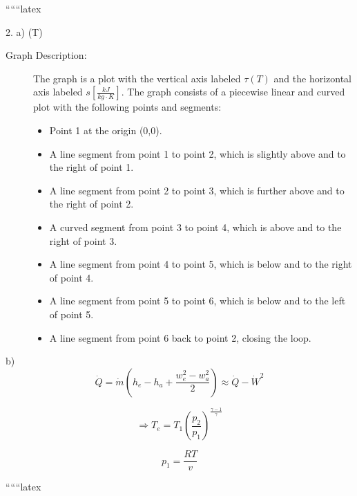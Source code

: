 
``````latex


2. a) \quad \tau (T)

\begin{description}
\item[Graph Description:] 
The graph is a plot with the vertical axis labeled \(\tau (T)\) and the horizontal axis labeled \(s \left[ \frac{kJ}{kg \cdot K} \right]\). The graph consists of a piecewise linear and curved plot with the following points and segments:
\begin{itemize}
    \item Point 1 at the origin (0,0).
    \item A line segment from point 1 to point 2, which is slightly above and to the right of point 1.
    \item A line segment from point 2 to point 3, which is further above and to the right of point 2.
    \item A curved segment from point 3 to point 4, which is above and to the right of point 3.
    \item A line segment from point 4 to point 5, which is below and to the right of point 4.
    \item A line segment from point 5 to point 6, which is below and to the left of point 5.
    \item A line segment from point 6 back to point 2, closing the loop.
\end{itemize}
\end{description}

b)
\[
\dot{Q} = \dot{m} \left( h_e - h_a + \frac{w_e^2 - w_a^2}{2} \right) \approx \dot{Q} - \dot{W}^2
\]

\[
\Rightarrow T_e = T_1 \left( \frac{p_2}{p_1} \right)^{\frac{\gamma - 1}{\gamma}}
\]

\[
p_1 = \frac{RT}{v}
\]

``````latex


